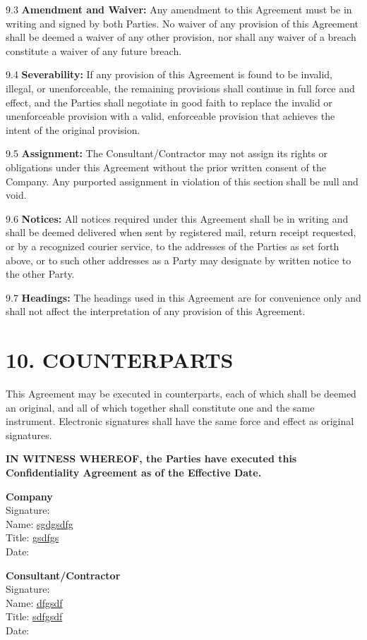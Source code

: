 \documentclass[12pt]{article}
\begin{document}
9.3 \textbf{Amendment and Waiver:} Any amendment to this Agreement must be in writing and signed by both Parties. No waiver of any provision of this Agreement shall be deemed a waiver of any other provision, nor shall any waiver of a breach constitute a waiver of any future breach.

9.4 \textbf{Severability:} If any provision of this Agreement is found to be invalid, illegal, or unenforceable, the remaining provisions shall continue in full force and effect, and the Parties shall negotiate in good faith to replace the invalid or unenforceable provision with a valid, enforceable provision that achieves the intent of the original provision.

9.5 \textbf{Assignment:} The Consultant/Contractor may not assign its rights or obligations under this Agreement without the prior written consent of the Company. Any purported assignment in violation of this section shall be null and void.

9.6 \textbf{Notices:} All notices required under this Agreement shall be in writing and shall be deemed delivered when sent by registered mail, return receipt requested, or by a recognized courier service, to the addresses of the Parties as set forth above, or to such other addresses as a Party may designate by written notice to the other Party.

9.7 \textbf{Headings:} The headings used in this Agreement are for convenience only and shall not affect the interpretation of any provision of this Agreement.

\section*{10. COUNTERPARTS}

This Agreement may be executed in counterparts, each of which shall be deemed an original, and all of which together shall constitute one and the same instrument. Electronic signatures shall have the same force and effect as original signatures.

\vspace{1cm}

\textbf{IN WITNESS WHEREOF, the Parties have executed this Confidentiality Agreement as of the Effective Date.}

\vspace{1cm}

\textbf{Company} \\
Signature: \underline{\hspace{6cm}} \\
Name: \underline{sgdgsdfg} \\
Title: \underline{gsdfgs} \\
Date: \underline{\hspace{5cm}}

\vspace{1cm}

\textbf{Consultant/Contractor} \\
Signature: \underline{\hspace{6cm}} \\
Name: \underline{dfgsdf} \\
Title: \underline{sdfgsdf} \\
Date: \underline{\hspace{5cm}}
\end{document}
